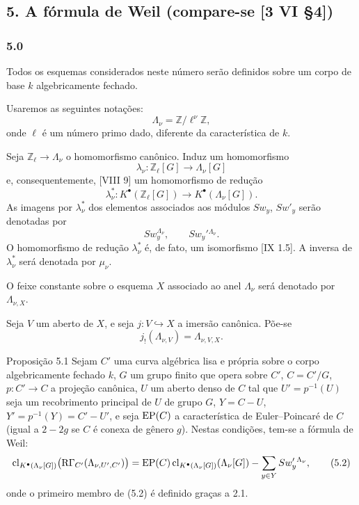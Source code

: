 \subsection*{5. A fórmula de Weil (compare-se [3 VI §4])}

\subsubsection*{5.0}

Todos os esquemas considerados neste número serão definidos sobre um corpo de base $k$ algebricamente fechado.

Usaremos as seguintes notações:
\[
\Lambda_\nu=\mathbb Z/\ell^\nu\mathbb Z,
\]
onde $\ell$ é um número primo dado, diferente da característica de $k$.

Seja $\mathbb Z_\ell\to\Lambda_\nu$ o homomorfismo canônico. Induz um homomorfismo
\[
\lambda_\nu:\mathbb Z_\ell[G]\longrightarrow \Lambda_\nu[G]
\]
e, consequentemente, [VIII 9] um homomorfismo de redução
\[
\lambda_\nu^*:K^{\bullet}(\mathbb Z_\ell[G])\longrightarrow K^{\bullet}(\Lambda_\nu[G]).
\]
As imagens por $\lambda_\nu^*$ dos elementos associados aos módulos $Sw_y$, $Sw'_y$ serão denotadas por
\[
Sw_y^{\Lambda_\nu},\qquad Sw_y'{}^{\Lambda_\nu}.
\]
O homomorfismo de redução $\lambda_\nu^*$ é, de fato, um isomorfismo [IX 1.5]. A inversa de $\lambda_\nu^*$ será denotada por $\mu_\nu$.

O feixe constante sobre o esquema $X$ associado ao anel $\Lambda_\nu$ será denotado por $\Lambda_{\nu,X}$.

Seja $V$ um aberto de $X$, e seja $j:V\hookrightarrow X$ a imersão canônica. Põe-se
\[
j_!(\Lambda_{\nu,V})=\Lambda_{\nu,V,X}.
\]

\begin{statement}{Proposição 5.1}
Sejam $C'$ uma curva algébrica lisa e própria sobre o corpo algebricamente fechado $k$, $G$ um grupo finito que opera sobre $C'$, $C=C'/G$, $p:C'\to C$ a projeção canônica, $U$ um aberto denso de $C$ tal que $U'=p^{-1}(U)$ seja um recobrimento principal de $U$ de grupo $G$, $Y=C-U$, $Y'=p^{-1}(Y)=C'-U'$, e seja $\operatorname{EP}(C)$ a característica de Euler--Poincaré de $C$ (igual a $2-2g$ se $C$ é conexa de gênero $g$).
Nestas condições, tem-se a fórmula de Weil:
\[
\operatorname{cl}_{K^{\bullet}(\Lambda_\nu[G])}\bigl(\mathrm{R}\Gamma_{C'}(\Lambda_{\nu,U',C'})\bigr)
=
\operatorname{EP}(C)\operatorname{cl}_{K^{\bullet}(\Lambda_\nu[G])}(\Lambda_\nu[G])
-\sum_{y\in Y}Sw_y'{}^{\Lambda_\nu},
\tag{5.2}
\]
onde o primeiro membro de (5.2) é definido graças a 2.1.
\end{statement}
